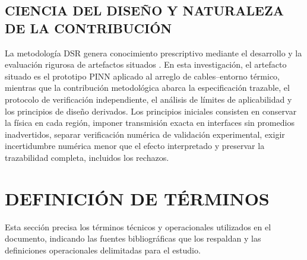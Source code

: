 \subsection{CIENCIA DEL DISEÑO Y NATURALEZA DE LA CONTRIBUCIÓN}

La metodología DSR genera conocimiento prescriptivo mediante el desarrollo y la evaluación rigurosa de artefactos situados \parencite[343--349]{gregor2013}. En esta investigación, el artefacto situado es el prototipo PINN aplicado al arreglo de cables--entorno térmico, mientras que la contribución metodológica abarca la especificación trazable, el protocolo de verificación independiente, el análisis de límites de aplicabilidad y los principios de diseño derivados. Los principios iniciales consisten en conservar la física en cada región, imponer transmisión exacta en interfaces sin promedios inadvertidos, separar verificación numérica de validación experimental, exigir incertidumbre numérica menor que el efecto interpretado y preservar la trazabilidad completa, incluidos los rechazos.

\section{DEFINICIÓN DE TÉRMINOS}
\label{sec:definicion-terminos}

Esta sección precisa los términos técnicos y operacionales utilizados en el documento, indicando las fuentes bibliográficas que los respaldan y las definiciones operacionales delimitadas para el estudio.

